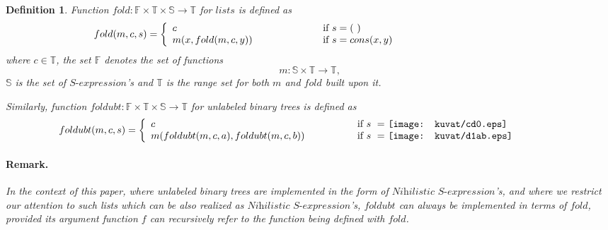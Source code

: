 \documentclass[11pt]{article} %
\newcommand{\eeq}{\end{equation}}
\newcommand{\beql}[1]{\begin{equation}\label{#1}}
\newcommand{\FoldFunSET}{{\mathbb F}}
\newcommand{\SexprSET}{{\mathbb S}}
\newcommand{\FoldRangeSET}{{\mathbb T}}
\newtheorem{definition}[theorem]{Definition}
\newcommand{\sexpr}{\ensuremath{\textit{S-expression}}\xspace}
\newcommand{\nsexpr}{\ensuremath{\textit{Nihilistic~S-expression}}\xspace}
\newcommand{\nilatom}{\ensuremath{\mathbf{(~)}}\xspace}
\begin{document}
\begin{definition} %
\normalfont


Function $fold : \FoldFunSET \times \FoldRangeSET \times \SexprSET \rightarrow \FoldRangeSET$
for $lists$ is defined as
\beql{DefFoldforLists}
fold(m,c,s) = \left\{ \begin{array}{p{5cm}p{7cm}}
 $c$ & \textrm{if $s = \nilatom$} \\
 $m(x,fold(m,c,y))$ & \textrm{if $s = cons(x,y)$}\\
\end{array} \right.
\eeq
where $c \in \FoldRangeSET$, 
the set $\FoldFunSET$ denotes the set of functions
$$
m : \SexprSET \times \FoldRangeSET \rightarrow \FoldRangeSET,
$$
$\SexprSET$ is the set of {\sexpr}'s and $\FoldRangeSET$ is the range
set for both $m$ and $fold$ built upon it.

Similarly, function $foldubt : \FoldFunSET \times \FoldRangeSET \times \SexprSET \rightarrow \FoldRangeSET$
for {\em unlabeled binary trees} is defined as
\beql{DefFoldforBinaryTrees}
foldubt(m,c,s) = \left\{ \begin{array}{p{7cm}p{7cm}}
 $c$ & \textrm{if $s~=~$}\texttt{[image: kuvat/cd0.eps]} \\
 $m(foldubt(m,c,a),foldubt(m,c,b))$ & \textrm{if $s~=~$}\texttt{[image: kuvat/d1ab.eps]} \\
\end{array} \right.
\eeq

\paragraph{Remark.}
In the context of this paper, where {\em unlabeled binary trees}
are implemented in the form of %
{\nsexpr}'s,
and where we restrict our attention to such {\em lists}
which can be also realized as {\nsexpr}'s,
$foldubt$ can always be implemented in terms of $fold$, provided
its argument function $f$ can recursively refer to the function
being defined with $fold$.


\end{definition}
\end{document}

